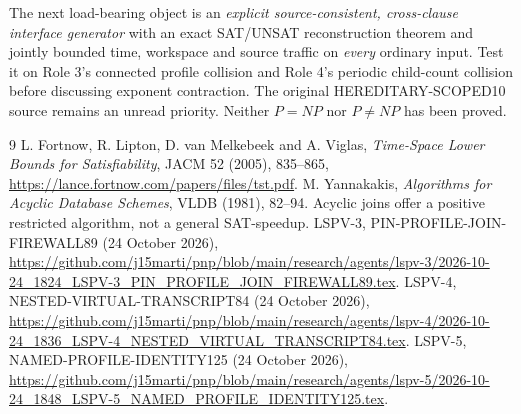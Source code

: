\documentclass[11pt]{article}
\begin{document}
The next load-bearing object is an \emph{explicit source-consistent, cross-clause interface generator} with an exact SAT/UNSAT reconstruction theorem and jointly bounded time, workspace and source traffic on \emph{every} ordinary input. Test it on Role 3's connected profile collision and Role 4's periodic child-count collision before discussing exponent contraction. The original HEREDITARY-SCOPED10 source remains an unread priority. Neither \(P=NP\) nor \(P\ne NP\) has been proved.

\begin{thebibliography}{9}
 L. Fortnow, R. Lipton, D. van Melkebeek and A. Viglas, \emph{Time-Space Lower Bounds for Satisfiability}, JACM 52 (2005), 835--865, \url{https://lance.fortnow.com/papers/files/tst.pdf}.
 M. Yannakakis, \emph{Algorithms for Acyclic Database Schemes}, VLDB (1981), 82--94. Acyclic joins offer a positive restricted algorithm, not a general SAT-speedup.
 LSPV-3, PIN-PROFILE-JOIN-FIREWALL89 (24 October 2026), \url{https://github.com/j15marti/pnp/blob/main/research/agents/lspv-3/2026-10-24_1824_LSPV-3_PIN_PROFILE_JOIN_FIREWALL89.tex}.
 LSPV-4, NESTED-VIRTUAL-TRANSCRIPT84 (24 October 2026), \url{https://github.com/j15marti/pnp/blob/main/research/agents/lspv-4/2026-10-24_1836_LSPV-4_NESTED_VIRTUAL_TRANSCRIPT84.tex}.
 LSPV-5, NAMED-PROFILE-IDENTITY125 (24 October 2026), \url{https://github.com/j15marti/pnp/blob/main/research/agents/lspv-5/2026-10-24_1848_LSPV-5_NAMED_PROFILE_IDENTITY125.tex}.
\end{thebibliography}
\end{document}
